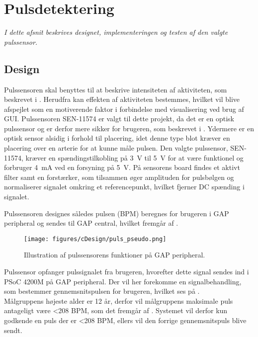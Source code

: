 \section{Pulsdetektering}\label{sec_de_im_te_puls}
\textit{I dette afsnit beskrives designet, implementeringen og testen af den valgte pulssensor.}

\subsection{Design} \label{sec_design_puls}
Pulssensoren skal benyttes til at beskrive intensiteten af aktiviteten, som beskrevet i . Herudfra kan effekten af aktiviteten bestemmes, hvilket vil blive afspejlet som en motiverende faktor i forbindelse med visualisering ved brug af GUI. \newline
Pulssensoren SEN-11574 er valgt til dette projekt, da det er en optisk pulssensor og er derfor mere sikker for brugeren, som beskrevet i . Ydermere er en optisk sensor alsidig i forhold til placering, idet denne type blot kræver en placering over en arterie for at kunne måle pulsen. \newline
Den valgte pulssensor, SEN-11574, kræver en spændingstilkobling på 3~V til 5~V for at være funktionel og forbruger 4~mA ved en forsyning på 5~V. På sensorens board findes et aktivt filter samt en forstærker, som tilsammen øger amplituden for pulsbølgen og normaliserer signalet omkring et referencepunkt, hvilket fjerner DC spænding i signalet. \citep{Murphy2016,Murphy2016_sensor}

Pulssensoren designes således pulsen (BPM) beregnes for brugeren i GAP peripheral og sendes til GAP central, hvilket fremgår af .

\begin{figure}[H]
	\centering
	\texttt{[image: figures/cDesign/puls\_pseudo.png]}
	\caption{Illustration af pulssensorens funktioner på GAP peripheral. }
	\label{fig:puls_pseudo}
\end{figure}

Pulssensor opfanger pulssignalet fra brugeren, hvorefter dette signal sendes ind i PSoC 4200M på GAP peripheral. Der vil her forekomme en signalbehandling, som bestemmer gennemsnitspulsen for brugeren, hvilket ses på . \\
Målgruppens højeste alder er 12 år, derfor vil målgruppens maksimale puls antageligt være <208 BPM, som det fremgår af . Systemet vil derfor kun godkende en puls der er <208 BPM, ellers vil den forrige gennemsnitspuls blive sendt.

